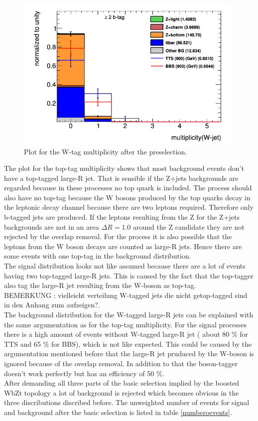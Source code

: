 \begin{figure}[h!]
\centering
\includegraphics[width=11cm]{figures/Wmultiplicity.png}
\caption{Plot for the W-tag multiplicity after the preselection.}
\label{bosonmultipli}
\end{figure}

The plot for the top-tag multiplicity shows that most background events don't have a top-tagged large-R jet.
That is sensible if the Z+jets backgrounds are regarded because in these processes no top quark is included. 
The \ttbar{} process should also have no top-tag because the W bosons produced by the top quarks decay in the leptonic decay channel because there are two leptons required.
Therefore only  b-tagged jets are produced.
If the leptons resulting from the Z for the Z+jets backgrounds are not in an area $\Delta R = 1.0$ around the Z candidate they are not rejected by the overlap removal.
For the \ttbar{} process it is also possible that the leptons from the W boson decays are counted as large-R jets.
Hence there are some events with one top-tag in the background distribution.\\
The signal distribution looks not like assumed because there are a lot of events having two top-tagged large-R jets.
This is caused by the fact that the top-tagger also tag the large-R jet resulting from the W-boson as top-tag.\\
BEMERKUNG : vielleicht verteilung W-tagged jets die nicht getop-tagged sind in den Anhang zum aufzeigen?.\\
The background distribution for the W-tagged large-R jets can be explained with the same argumentation as for the top-tag multiplicity.
For the signal processes there is a high amount of events without W-tagged large-R jet ( about 80 \% for TTS and 65 \% for BBS), which is not like expected.
This could be caused by the argumentation mentioned before that the large-R jet pruduced by the W-boson is ignored because of the overlap removal.
In addition to that the boson-tagger doesn't work perfectly but has an efficiency of 50 \%.\\
After demanding all three parts of the basic selection implied by the boosted WbZt topology a lot of background is rejected which becomes obvious in the three discributions discribed before.
The unweighted number of events for signal and background after the basic selection is listed in table \ref{numberoevents}.
\vspace{-0.19cm}

